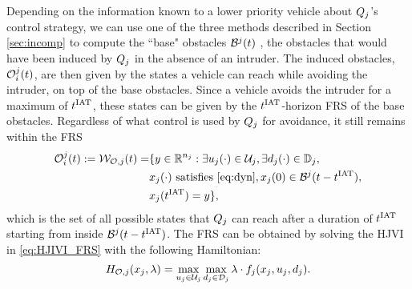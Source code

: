 Depending on the information known to a lower priority vehicle about $Q_j$'s control strategy, we can use one of the three methods described in Section \ref{sec:incomp} to compute the ``base" obstacles $\mathcal{B}^j(t)$ , the obstacles that would have been induced by $Q_j$ in the absence of an intruder. The induced obstacles, $\mathcal{O}_i^j(t)$, are then given by the states a vehicle can reach while avoiding the intruder, on top of the base obstacles. Since a vehicle avoids the intruder for a maximum of $t^\text{IAT}$, these states can be given by the $t^\text{IAT}$-horizon FRS of the base obstacles. Regardless of what control is used by $Q_j$ for avoidance, it still remains within the FRS 
\begin{equation} \label{eq:intObs}
\begin{aligned}
\ioset_i^j(t) := \frs_{\mathcal{O}, j}(t) = & \{y \in \R^{n_j}: \exists \ctrl_j(\cdot) \in \cset_j, \exists \dstb_j(\cdot) \in \dfset_j, \\
& \state_j(\cdot) \text{ satisfies \eqref{eq:dyn}}, \state_j(0) \in \boset^j(t-\iat), \\
& \state_j(\iat) = y\},
\end{aligned}
\end{equation}
which is the set of all possible states that $Q_j$ can reach after a duration of $t^\text{IAT}$ starting from inside $\mathcal{B}^j(t-t^\text{IAT})$. The FRS can be obtained by solving the HJVI in \eqref{eq:HJIVI_FRS} with the following Hamiltonian:
\begin{equation}
\ham_{\mathcal{O}, j}(\state_j, \costate) = \max_{\ctrl_j \in \cset_j} \max_{\dstb_j \in \dset_j} \costate \cdot f_j (\state_j, \ctrl_j, \dstb_j) \label{intobs2}.
\end{equation} 
%
%

